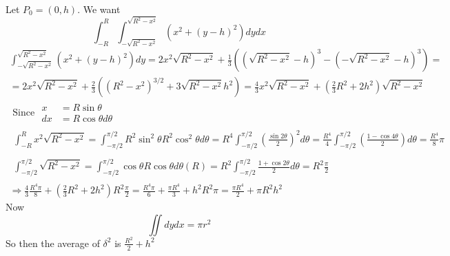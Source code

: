 \documentclass[twoside]{amsart}
\theoremstyle{plain}
\theoremstyle{definition}
\newcommand{\exercisehead}[1]
  {
   \noindent{\small\bf Exercise #1.}
   \smallskip}
\begin{document}
\exercisehead{20} Let $P_0 = (0,h)$.  We want
\[
\int_{-R}^R \int_{-\sqrt{ R^2 - x^2}}^{\sqrt{R^2 - x^2 }} (x^2 + (y-h)^2) dy dx
\]
\[
\begin{gathered}
  \int_{-\sqrt{R^2 - x^2} }^{\sqrt{ R^2 - x^2}} (x^2 + (y-h)^2) dy = 2x^2 \sqrt{ R^2 - x^2} + \frac{1}{3} (( \sqrt{ R^2-x^2} - h )^3 - (-\sqrt{ R^2 - x^2 } - h )^3 ) = \\
  =  2 x^2 \sqrt{ R^2-x^2 }+\frac{2}{3} ((R^2-x^2)^{3/2} + 3 \sqrt{ R^2-x^2} h^2 )  = \frac{4}{3} x^2 \sqrt{ R^2-x^2} + \left( \frac{2}{3} R^2 + 2h^2 \right) \sqrt{ R^2-x^2}
\end{gathered}
\]
\[
\begin{gathered}
  \text{ Since } \begin{aligned} x & = R \sin{\theta} \\ dx & = R \cos{\theta} d\theta \end{aligned} \\ 
  \begin{gathered}
  \int_{-R}^{R} x^2 \sqrt{ R^2- x^2} = \int_{-\pi/2}^{\pi/2} R^2 \sin^2{\theta} R^2 \cos^2{\theta} d\theta = R^4 \int_{-\pi/2}^{\pi/2} \left( \frac{\sin{2\theta}}{2} \right)^2 d\theta = \frac{R^4}{4} \int_{-\pi/2}^{\pi/2} \left( \frac{ 1 - \cos{4\theta}}{2} \right) d\theta = \frac{R^4}{8} \pi  
  \end{gathered} \\
  \begin{gathered}
    \int_{-\pi/2}^{\pi/2} \sqrt{ R^2 - x^2} = \int_{-\pi/2}^{\pi/2} \cos{\theta} R \cos{\theta} d\theta (R) = R^2 \int_{-\pi/2}^{\pi/2} \frac{1 + \cos{2\theta} }{2} d\theta = R^2 \frac{\pi}{2} 
  \end{gathered} \\
  \Longrightarrow \frac{4}{3} \frac{ R^4 \pi}{8} + \left( \frac{2}{3} R^2 + 2h^2 \right) R^2 \frac{\pi}{2} = \frac{ R^4 \pi}{6} + \frac{ \pi R^4}{3} + h^2 R^2 \pi = \frac{ \pi R^4}{2} + \pi R^2 h^2 
\end{gathered}
\]
Now 
\[
\iint dy dx = \pi r^2
\]
So then the average of $\delta^2$ is $\boxed{ \frac{R^2}{2} + h^2 }$
\end{document}
